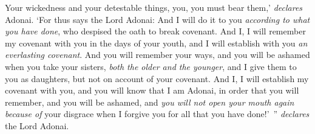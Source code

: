 \begin{biblechapter}
\verse Your wickedness and your detestable things, you, you must bear them,’ \textit{declares} Adonai.
\verse ‘For thus says the Lord Adonai: And I will do it to you \textit{according to what you have done}, who despised the oath to break covenant.
\verse And I, I will remember my covenant with you in the days of your youth, and I will establish with you \textit{an everlasting covenant}.
\verse And you will remember your ways, and you will be ashamed when you take your sisters, \textit{both the older and the younger}, and I give them to you as daughters, but not on account of your covenant.
\verse And I, I will establish my covenant with you, and you will know that I am Adonai,
\verse in order that you will remember, and you will be ashamed, and \textit{you will not open your mouth again} \textit{because of} your disgrace when I forgive you for all that you have done!’ ” \textit{declares} the Lord Adonai.
\end{biblechapter}

